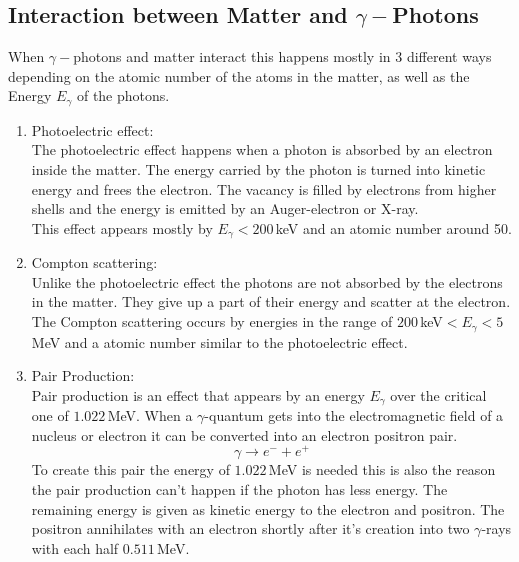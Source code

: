 \documentclass[30pt,a4paper]{article}
\begin{document}
	\subsection{Interaction between Matter and $\gamma-$Photons}	
 	When $\gamma-$photons and matter interact this happens mostly in 3 different ways depending on the atomic number of the atoms in the matter, as well as the Energy $E_\gamma$ of the photons.
 	\begin{enumerate}
 		\item Photoelectric effect:\\
 		The photoelectric effect happens when a photon is absorbed by an electron inside the matter. The energy carried by the photon is turned into kinetic energy and frees the electron. The vacancy is filled by electrons from higher shells and the energy is emitted by an Auger-electron or X-ray.\\
 		This effect appears mostly by $E_\gamma<200$\,keV and an atomic number around 50.
 		\item Compton scattering:\\
 		Unlike the photoelectric effect the photons are not absorbed by the electrons in the matter. They give up a part of their energy and scatter at the electron.\\
 		The Compton scattering occurs by energies in the range of $200$\,keV$<E_\gamma<5$\,MeV and a atomic number similar to the photoelectric effect.
 		\item Pair Production:\\
 		Pair production is an effect that appears by an energy $E_\gamma$ over the critical one of $1.022$\,MeV. When a $\gamma$-quantum gets into the electromagnetic field of a nucleus or electron it can be converted into an electron positron pair. 
 		$$\gamma \rightarrow e^- + e^+$$
 		To create this pair the energy of $1.022$\,MeV is needed this is also the reason the pair production can't happen if the photon has less energy. The remaining energy is given as kinetic energy to the electron and positron. The positron annihilates with an electron shortly after it's creation into two $\gamma$-rays with each half $0.511$\,MeV.
 	\end{enumerate}
\end{document}
